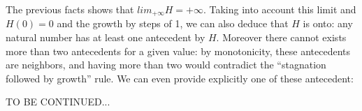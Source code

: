 \documentclass[a4paper,11pt]{article}
\begin{document}
The previous facts shows that $lim_{+\infty} H = +\infty$.
Taking into account this limit and $H(0)=0$ and the growth by steps of
1, we can also deduce that $H$ is onto: any natural number has at
least one antecedent by $H$. Moreover there cannot exists more than
two antecedents for a given value: by monotonicity, these antecedents
are neighbors,
and having more than two would contradict the ``stagnation followed
by growth'' rule.
We can even provide explicitly one of these antecedent:

\TODO TO BE CONTINUED...






\end{document}
